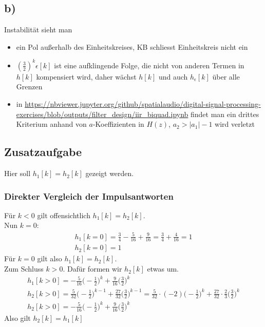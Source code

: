 \documentclass[11pt,a4paper,DIV=12]{scrartcl}
\begin{document}
\subsection*{b)}
%
Instabilität sieht man
%
\begin{itemize}
	\item ein Pol außerhalb des Einheitskreises, KB schliesst Einheitskreis nicht ein
	\item $\left(\frac{3}{2}\right)^k \epsilon[k]$ ist eine aufklingende Folge, die nicht von anderen Termen in $h[k]$ kompensiert wird, daher wächst $h[k]$ und auch $h_\epsilon[k]$ über alle Grenzen
	\item in \url{https://nbviewer.jupyter.org/github/spatialaudio/digital-signal-processing-exercises/blob/outputs/filter_design/iir_biquad.ipynb}
	findet man ein drittes Kriterium anhand von $a$-Koeffizienten in $H(z)$, $a_2>|a_1|-1$ wird verletzt
\end{itemize}
%
\newpage
\subsection*{Zusatzaufgabe}
%
Hier soll $h_1[k]=h_2[k]$ gezeigt werden.
%
\subsubsection*{Direkter Vergleich der Impulsantworten}
%
Für $k<0$ gilt offensichtlich $h_1[k]=h_2[k]$.\\
%
Nun $k=0$:
%
\begin{gather}
	h_1[k=0]=\frac{3}{4}-\frac{5}{16}+\frac{9}{16}=\frac{3}{4}+\frac{4}{16}=1\\
	h_2[k=0]=1
\end{gather}
%
%
Für $k=0$ gilt also $h_1[k]=h_2[k]$.\\
%
Zum Schluss $k>0$. Dafür formen wir $h_2[k]$ etwas um.
%
%
\begin{gather}
	h_1[k>0]=-\frac{5}{16}\bigg (-\frac{1}{2}\bigg )^k+\frac{9}{16}\bigg (\frac{3}{2}\bigg )^k\\
	h_2[k>0]=\frac{5}{32}\bigg (-\frac{1}{2}\bigg )^{k-1}+\frac{27}{32}\bigg (\frac{3}{2}\bigg )^{k-1}
	=\frac{5}{32}\cdot(-2)\bigg (-\frac{1}{2}\bigg )^k+\frac{27}{32}\cdot\frac{2}{3}\bigg (\frac{3}{2}\bigg )^k\\
	h_2[k>0]=-\frac{5}{16}\bigg (-\frac{1}{2}\bigg )^k+\frac{9}{16}\bigg (\frac{3}{2}\bigg )^k
\end{gather}
%
%
Also gilt $h_2[k]=h_1[k]$
%
\end{document}
